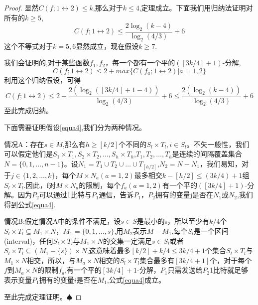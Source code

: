 \documentclass[]{article}
\newtheorem*{proof}{证明}
\begin{document}
	\begin{proof}
		显然$C(f;1\leftrightarrow 2)\leq k$,那么对于$k\leq 4$,定理成立。下面我们用归纳法证明对所有的$k\geq 5$,
		\begin{equation}\label{equa3}
			C(f;1\leftrightarrow 2)\leq \dfrac{2\log_2 (k-4)}{\log_2(4/3)}  +6
		\end{equation}
		这个不等式对于$k=5,6$显然成立，现在假设$k\geq 7$.\par
		
		我们会证明的,对于某些函数$f_1,f_2$，每一个都有一个平的$([3k/4]+1)$-分解,
		\begin{equation}\label{equa4}
			C(f;1\leftrightarrow 2)\leq 2+max\{C(f_a;1\leftrightarrow 2) | a=1,2\}
		\end{equation}
		利用这个归纳假设，可得
		\[C(f;1\leftrightarrow 2) \leq 2+ \dfrac{2(\log_2([3k/4]+1-4))}{\log_2(4/3)} +6 \leq \dfrac{2(\log_2(k-4))}{\log_2(4/3)} +6\]
		至此完成归纳。\par
		下面需要证明假设\ref{equa4},我们分为两种情况。\par
		情况A：存在$s\in M$,那么有$h\geq [k/2]$个不同的$S_l\times T_l,i\in S_l$。不失一般性，我们可以假定他们是$S_1\times T_1,S_2\times T_2,\ldots,S_h\times T_h$,$T_1,T_2,\ldots,T_h$是连续的间隔覆盖集合$N=\{0,1,\ldots,n-1\}$。设$N_1=T_1\cup T_2 \cup \ldots \cup T_{[h/2]}$,$N_2=N-N_1$，我们易知，对于$j\in \{1,2,\ldots,k\}$，每个$M\times N_a(a=1,2)$最多相交$k-[h/2]\leq (3k/4)+1$组$S_l \times T_l$.因此，f对$M\times N_a$的限制，每个$f_a(a=1,2)$有一个平的$([3k/4]+1)$-分解。因为$P_2$可以通过1比特与$P_1$通信，告诉$P_1$，$P_2$拥有的变量j是否在$N_1$或$N_2$,我们得到公式\ref{equa4}.
		\par
		情况B:假定情况A中的条件不满足，设$s\in S$是最小的s，所以至少有$k/4$个$S_l\times T_l \subseteq M_1\times N$，$M_1=\{0,1,\ldots,s\}$,用$M_2$表示$M-M_1$,每个$S_l$是一个区间(interval)，任何$S_l\times T_l$与$M_1\times N$的交集一定满足$s\in S_l$或者$S_l \times T_l\subseteq (M_1-\{s\})\times N$,这意味着最多$[k/2]+k/4 \leq 3k/4 +1 $个集合$S_l\times T_l$与$M_1\times N$相交，所以，与$M_a\times N$相交的$S_l\times T_l$集合最多有$[3k/4 + 1]$个，对于每个$f$到$M_a\times N$的限制$f_a$,有一个平的$[3k/4]+1$-分解，$P_1$只需发送给$P_2$1比特就足够表示变量$P_1$拥有的变量$i$是否在$M_1$,公式\ref{equa4}成立。
		\par
		至此完成定理证明。$\spadesuit$
	\end{proof}
	\par
	
\end{document}
